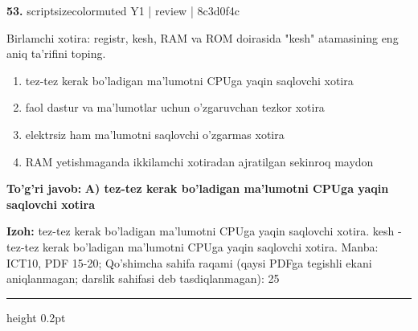\documentclass[10pt,a4paper]{article}
\begin{document}
{\bfseries\sffamily\color{ink} 53.} {scriptsizecolor{muted} Y1 | review | 8c3d0f4c}
\par
Birlamchi xotira: registr, kesh, RAM va ROM doirasida "kesh" atamasining eng aniq ta'rifini toping.
\begin{enumerate}[label=\Alph*),leftmargin=9mm]
\item tez-tez kerak bo'ladigan ma'lumotni CPUga yaqin saqlovchi xotira
\item faol dastur va ma'lumotlar uchun o'zgaruvchan tezkor xotira
\item elektrsiz ham ma'lumotni saqlovchi o'zgarmas xotira
\item RAM yetishmaganda ikkilamchi xotiradan ajratilgan sekinroq maydon
\end{enumerate}
\begin{tcolorbox}[enhanced,breakable,colback=teal!4,colframe=teal!60!black,boxrule=0.45pt,arc=1.2mm,left=2.7mm,right=2.7mm,top=1.8mm,bottom=1.8mm,before skip=2mm,after skip=2mm]
{\bfseries\sffamily\color{teal}To'g'ri javob:} \textbf{A) tez-tez kerak bo'ladigan ma'lumotni CPUga yaqin saqlovchi xotira}
\par\smallskip
{\bfseries Izoh:} tez-tez kerak bo'ladigan ma'lumotni CPUga yaqin saqlovchi xotira. kesh - tez-tez kerak bo'ladigan ma'lumotni CPUga yaqin saqlovchi xotira. Manba: ICT10, PDF 15-20; Qo'shimcha sahifa raqami (qaysi PDFga tegishli ekani aniqlanmagan; darslik sahifasi deb tasdiqlanmagan): 25
\end{tcolorbox}
\vspace{2mm}\hrule height 0.2pt\vspace{3mm}
\end{document}
